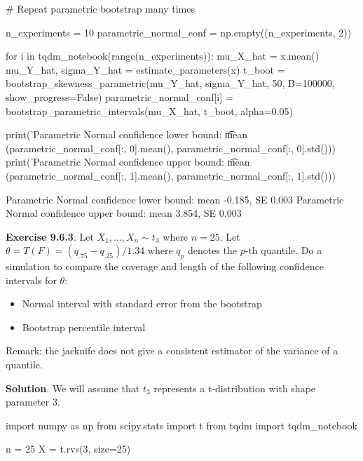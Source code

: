 \begin{python}
# Repeat parametric bootstrap many times

n_experiments = 10
parametric_normal_conf = np.empty((n_experiments, 2))

for i in tqdm_notebook(range(n_experiments)):
    mu_X_hat = x.mean()
    mu_Y_hat, sigma_Y_hat = estimate_parameters(x)
    t_boot = bootstrap_skewness_parametric(mu_Y_hat, sigma_Y_hat, 50, B=100000, show_progress=False)
    parametric_normal_conf[i] = bootstrap_parametric_intervals(mu_X_hat, t_boot, alpha=0.05)
\end{python}

\begin{python}
print('Parametric Normal confidence lower bound: \t mean %
      (parametric_normal_conf[:, 0].mean(), parametric_normal_conf[:, 0].std()))
print('Parametric Normal confidence upper bound: \t mean %
      (parametric_normal_conf[:, 1].mean(), parametric_normal_conf[:, 1].std()))
\end{python}

\begin{console}
Parametric Normal confidence lower bound:        mean -0.185, SE 0.003
Parametric Normal confidence upper bound:        mean 3.854, SE 0.003
\end{console}

\textbf{Exercise 9.6.3}. Let \(X_1, \dots, X_n \sim t_3\) where
\(n = 25\). Let \(\theta = T(F) = (q_{.75} - q_{.25})/1.34\) where
\(q_p\) denotes the \(p\)-th quantile. Do a simulation to compare the
coverage and length of the following confidence intervals for
\(\theta\):

\begin{itemize}[tightlist]
\item
  Normal interval with standard error from the bootstrap
\item
  Bootstrap percentile interval
\end{itemize}

Remark: the jacknife does not give a consistent estimator of the
variance of a quantile.

\textbf{Solution}. We will assume that \(t_3\) represents a
t-distribution with shape parameter 3.

\begin{python}
import numpy as np
from scipy.stats import t
from tqdm import tqdm_notebook

n = 25
X = t.rvs(3, size=25)
\end{python}

